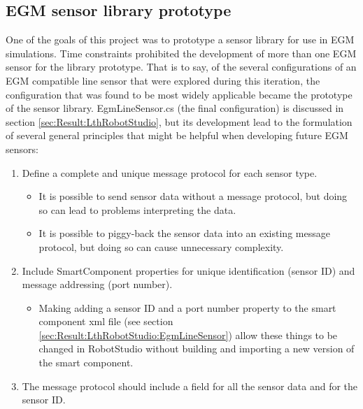 \documentclass{cslthse-msc}
\begin{document}
\subsection{EGM sensor library prototype} 
\label{sec:Dev:I2:sensor_lib_prototype}
One of the goals of this project was to prototype a sensor library for use in EGM simulations. Time constraints prohibited the development of more than one EGM sensor for the library prototype. That is to say, of the several configurations of an EGM compatible line sensor that were explored during this iteration, the configuration that was found to be most widely applicable became the prototype of the sensor library. EgmLineSensor.cs (the final configuration) is discussed in section \ref{sec:Result:LthRobotStudio}, but its development lead to the formulation of several general principles that might be helpful when developing future EGM sensors:
\begin{enumerate}
\item Define a complete and unique message protocol for each sensor type.
    \begin{itemize}
        \item It is possible to send sensor data without a message protocol, but doing so can lead to problems interpreting the data.
        \item It is possible to piggy-back the sensor data into an existing message protocol, but doing so can cause unnecessary complexity.
    \end{itemize}
\item Include SmartComponent properties for unique identification (sensor ID) and message addressing (port number). 
    \begin{itemize}
        \item Making adding a sensor ID and a port number property to the smart component xml file (see section \ref{sec:Result:LthRobotStudio:EgmLineSensor}) allow these things to be changed in RobotStudio without building and importing a new version of the smart component. 
    \end{itemize}
\item The message protocol should include a field for all the sensor data and for the sensor ID. 
\end{enumerate}
\end{document}
